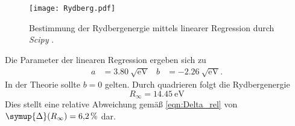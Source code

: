 \begin{figure}
  \centering
  \texttt{[image: Rydberg.pdf]}
  \caption{Bestimmung der Rydbergenergie mittels linearer Regression durch \textit{Scipy} \cite{scipy}.}
  \label{fig:Rydberg}
\end{figure}

Die Parameter der linearen Regression ergeben sich zu 
\begin{align*}
  a &= \qty{3.80}{\sqrt{\unit{\electronvolt}}} & b &= \qty{-2.26}{\sqrt{\unit{\electronvolt}}}.
\end{align*}
In der Theorie sollte $b = 0$ gelten. 
Durch quadrieren folgt die Rydbergenergie
\begin{equation*}
  R_\infty = \qty{14.45}{\electronvolt}
\end{equation*}
Dies stellt eine relative Abweichung gemäß \autoref{eqn:Delta_rel} von $\symup{\Delta}(R_\infty) = \qty{6.2}{\percent}$ dar.
